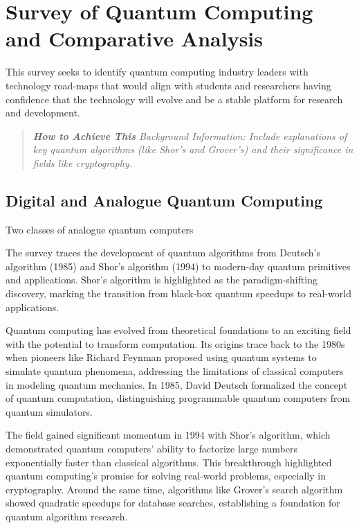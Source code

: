 \section{Survey of Quantum Computing and Comparative Analysis}

This survey seeks to identify quantum computing industry leaders with technology road-maps that would align with students
and researchers having confidence that the technology will evolve and be a stable platform for research and development.


\begin{quote}\itshape
	\textbf{\emph{How to Achieve This}}
	\emph{Background Information}: Include explanations of key quantum algorithms (like Shor’s and Grover’s) and their significance in fields like cryptography.
\end{quote}\ignorespacesafterend

\subsection{Digital and Analogue Quantum Computing}

Two classes of analogue quantum computers

The survey traces the development of quantum algorithms from Deutsch's algorithm (1985) and Shor's algorithm (1994) to modern-day 
quantum primitives and applications.
Shor's algorithm is highlighted as the paradigm-shifting discovery, marking the transition from black-box quantum speedups to real-world applications.

Quantum computing has evolved from theoretical foundations to an exciting field with the potential to transform computation. Its origins trace back to the 1980s when pioneers like Richard Feynman proposed using quantum systems to simulate quantum phenomena, addressing the limitations of classical computers in modeling quantum mechanics. In 1985, David Deutsch formalized the concept of quantum computation, distinguishing programmable quantum computers from quantum simulators.

The field gained significant momentum in 1994 with Shor’s algorithm, which demonstrated quantum computers' ability to factorize large numbers exponentially faster than classical algorithms. This breakthrough highlighted quantum computing's promise for solving real-world problems, especially in cryptography. Around the same time, algorithms like Grover’s search algorithm showed quadratic speedups for database searches, establishing a foundation for quantum algorithm research.

